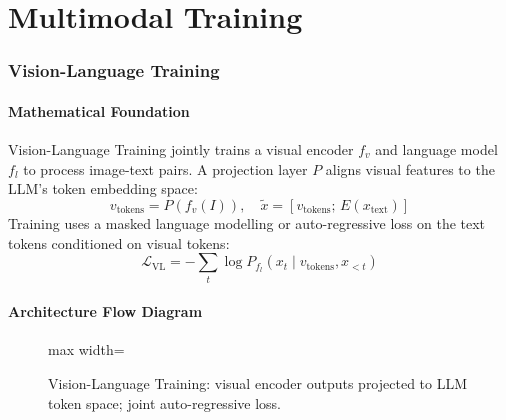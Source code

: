 \newpage
\part{Multimodal Training}

\section{Vision-Language Training}

\subsection{Mathematical Foundation}
Vision-Language Training jointly trains a visual encoder $f_v$ and language model $f_l$ to process image-text pairs. A projection layer $P$ aligns visual features to the LLM's token embedding space:
\begin{equation}
  v_{\text{tokens}} = P(f_v(I)),\quad \tilde{x} = [v_{\text{tokens}};\, E(x_{\text{text}})]
\end{equation}
Training uses a masked language modelling or auto-regressive loss on the text tokens conditioned on visual tokens:
\begin{equation}
  \mathcal{L}_{\text{VL}} = -\sum_t \log P_{f_l}(x_t \mid v_{\text{tokens}}, x_{<t})
\end{equation}

\subsection{Architecture Flow Diagram}

\begin{figure}[h]
\centering
\begin{adjustbox}{max width=\linewidth}
\end{adjustbox}
\caption{Vision-Language Training: visual encoder outputs projected to LLM token space; joint auto-regressive loss.}
\end{figure}

